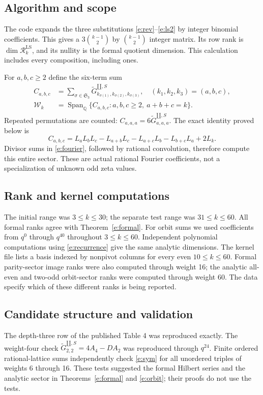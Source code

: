 \documentclass[12pt]{amsart}
\theoremstyle{definition}
\theoremstyle{remark}
\numberwithin{equation}{section}
\newcommand{\sh}{\mathbin{\amalg}}
\newcommand{\sG}[1]{\widetilde G^{\sh,S}_{#1}}
\newcommand{\Span}{\operatorname{Span}_{\mathbb Q}}
\newcommand{\RR}{\mathcal R^{\mathrm{LS}}}
\newcommand{\WW}{\mathcal W}
\numberwithin{equation}{section}
\begin{document}
\subsection{Algorithm and scope}
The code expands the three substitutions
\eqref{e:rev}--\eqref{e:ls2} by integer binomial coefficients. This gives
a $3\binom{k-1}{2}$ by $\binom{k-1}{2}$ integer matrix.
Its row rank is $\dim\RR_k$, and its nullity is the formal quotient dimension.
This calculation includes every composition, including ones.

For $a,b,c\ge2$ define the six-term sum
\begin{equation}\label{e:orbitdef}
 \begin{aligned}
 C_{a,b,c}&=\sum_{\sigma\in\mathfrak S_3}
          \sG{k_{\sigma(1)},k_{\sigma(2)},k_{\sigma(3)}},
 \quad (k_1,k_2,k_3)=(a,b,c),\\
 \WW_k&=\Span\{C_{a,b,c}:a,b,c\ge2,\ a+b+c=k\}.
 \end{aligned}
\end{equation}
Repeated permutations are counted: $C_{a,a,a}=6\sG{a,a,a}$.
The exact identity proved below is
\begin{equation}\label{e:sym}
 C_{a,b,c}=L_aL_bL_c-L_{a+b}L_c-L_{a+c}L_b-L_{b+c}L_a+2L_k.
\end{equation}
Divisor sums in \eqref{e:fourier}, followed by rational convolution, therefore
compute this entire sector. These are actual rational Fourier coefficients,
not a specialization of unknown odd zeta values.

\subsection{Rank and kernel computations}
The initial range was $3\le k\le30$; the separate test range was
$31\le k\le60$. All formal ranks agree with Theorem~\ref{e:formal}.
For orbit sums we used coefficients from $q^0$ through $q^{40}$ throughout
$3\le k\le60$. Independent polynomial computations using
\eqref{e:recurrence} give the same analytic dimensions. The kernel file
lists a basis indexed by nonpivot columns for every even $10\le k\le60$.
Formal parity-sector image ranks were also computed through weight 16;
the analytic all-even and two-odd orbit-sector ranks were computed through
weight 60. The data specify which of these different ranks is being reported.

\subsection{Candidate structure and validation}
The depth-three row of the published Table 4 was reproduced exactly.
The weight-four check
$\sG{2,2}=4A_4-D A_2$ was reproduced through $q^{24}$.
Finite ordered rational-lattice sums independently check
\eqref{e:sym} for all unordered triples of weights 6 through 16.
These tests suggested the formal Hilbert series and the analytic sector in
Theorems~\ref{e:formal} and \ref{e:orbit}; their proofs do not use the tests.
\end{document}
